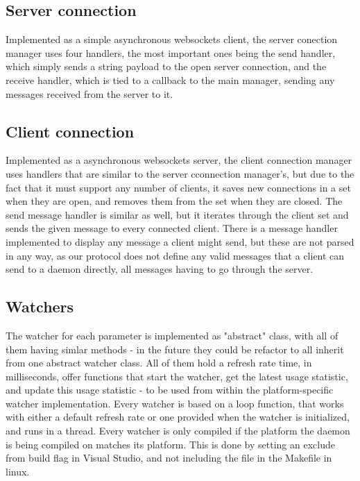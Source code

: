 \documentclass{l3proj}
\begin{document}
\subsection{Server connection}

Implemented as a simple asynchronous websockets client, the server conection manager uses four handlers, the most important ones being the send handler, which simply sends a string payload to the open server connection, and the receive handler, which is tied to a callback to the main manager, sending any messages received from the server to it.

\subsection{Client connection}

Implemented as a asynchronous websockets server, the client connection manager uses handlers that are similar to the server cconnection manager's, but due to the fact that it must support any number of clients, it saves new connections in a set when they are open, and removes them from the set when they are closed. The send message handler is similar as well, but it iterates through the client set and sends the given message to every connected client. There is a message handler implemented to display any message a client might send, but these are not parsed in any way, as our protocol does not define any valid messages that a client can send to a daemon directly, all messages having to go through the server.

\subsection{Watchers}

The watcher for each parameter is implemented as "abstract" class, with all of them having simlar methods - in the future they could be refactor to all inherit from one abstract watcher class. All of them hold a refresh rate time, in milliseconds, offer functions that start the watcher, get the latest usage statistic, and update this usage statistic - to be used from within the platform-specific watcher implementation. Every watcher is based on a loop function, that works with either a default refresh rate or one provided when the watcher is initialized, and runs in a thread.
Every watcher is only compiled if the platform the daemon is being compiled on matches its platform. This is done by setting an exclude from build flag in Visual Studio, and not including the file in the Makefile in linux.
\end{document}
